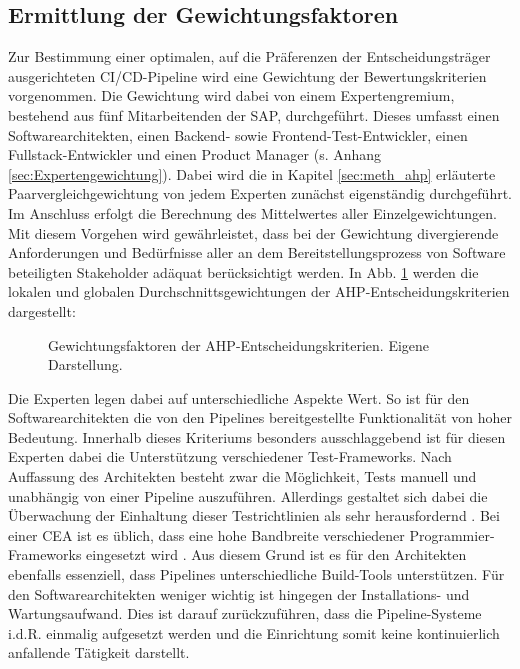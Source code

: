 \subsection{Ermittlung der Gewichtungsfaktoren}
\label{sec:Gewichtung}
Zur Bestimmung einer optimalen, auf die Präferenzen der Entscheidungsträger ausgerichteten CI/CD-Pipeline wird eine Gewichtung der Bewertungskriterien vorgenommen. Die Gewichtung wird dabei von einem Expertengremium, bestehend aus fünf Mitarbeitenden der SAP, durchgeführt. Dieses umfasst einen Softwarearchitekten, einen Backend- sowie Frontend-Test-Entwickler, einen Fullstack-Entwickler und einen Product Manager (s. Anhang \ref{sec:Expertengewichtung}). Dabei wird die in Kapitel \ref{sec:meth_ahp} erläuterte Paarvergleichgewichtung von jedem Experten zunächst eigenständig durchgeführt. Im Anschluss erfolgt die Berechnung des Mittelwertes aller Einzelgewichtungen. Mit diesem Vorgehen wird gewährleistet, dass bei der Gewichtung divergierende Anforderungen und Bedürfnisse aller an dem Bereitstellungsprozess von Software beteiligten Stakeholder adäquat berücksichtigt werden.   
In Abb. \ref{fig:AHP_G} werden die lokalen und globalen Durchschnittsgewichtungen der AHP-Entscheidungskriterien dargestellt:
\begin{center}
	\begin{figure}[H]
		\centering
		\caption[Gewichtungsfaktoren der AHP-Entscheidungskriterien]{Gewichtungsfaktoren der AHP-Entscheidungskriterien. Eigene Darstellung.}
		\label{fig:AHP_G}
	\end{figure}
\end{center}
\vspace*{-15mm}
Die Experten legen dabei auf unterschiedliche Aspekte Wert. So ist für den Softwarearchitekten die von den Pipelines bereitgestellte Funktionalität von hoher Bedeutung. Innerhalb dieses Kriteriums besonders ausschlaggebend ist für diesen Experten dabei die Unterstützung verschiedener Test-Frameworks. Nach Auffassung des Architekten besteht zwar die Möglichkeit, Tests manuell und unabhängig von einer Pipeline auszuführen. Allerdings gestaltet sich dabei die Überwachung der Einhaltung dieser Testrichtlinien als sehr herausfordernd \cite[Z. 18 ff.]{SoftwareArchitektSAPDTSIntegration.}. Bei einer CEA ist es üblich, dass eine hohe Bandbreite verschiedener Programmier-Frameworks eingesetzt wird \cite[Z. 13 ff.]{SoftwareArchitektSAPDTSIntegration.}. Aus diesem Grund ist es für den Architekten ebenfalls essenziell, dass Pipelines unterschiedliche Build-Tools unterstützen. Für den Softwarearchitekten weniger wichtig ist hingegen der Installations- und Wartungsaufwand. Dies ist darauf zurückzuführen, dass die Pipeline-Systeme i.d.R. einmalig aufgesetzt werden und die Einrichtung somit keine kontinuierlich anfallende Tätigkeit darstellt.
